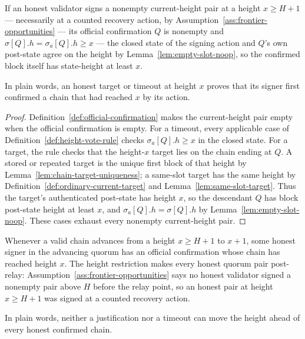 \begin{lemma}
\label{lem:height-vote-confirmation}
If an honest validator signs a nonempty current-height pair at a height
\(x\geq H+1\) --- necessarily at a counted recovery action, by
Assumption~\ref{ass:frontier-opportunities} ---
its official confirmation \(Q\) is nonempty and
\(\sigma[Q].h=\sigma_a[Q].h\geq x\) --- the closed state of the signing
action and \(Q\)'s own post-state agree on the height by
Lemma~\ref{lem:empty-slot-noop}, so the confirmed block itself has
state-height at least \(x\).

In plain words, an honest target or timeout at height \(x\) proves that its
signer first confirmed a chain that had reached \(x\) by its action.
\end{lemma}

\begin{proof}
Definition~\ref{def:official-confirmation} makes the current-height pair empty
when the official confirmation is empty.  For a timeout, every applicable
case of Definition~\ref{def:height-vote-rule} checks
\(\sigma_a[Q].h\geq x\) in the closed state.  For a target, the rule checks that the height-\(x\)
target lies on the chain ending at \(Q\).  A stored or repeated target is the
unique first block of that height by
Lemma~\ref{lem:chain-target-uniqueness}; a same-slot target has the same
height by Definition~\ref{def:ordinary-current-target} and
Lemma~\ref{lem:same-slot-target}.  Thus the target's authenticated post-state
has height \(x\), so the descendant \(Q\) has block post-state height at
least \(x\), and \(\sigma_a[Q].h=\sigma[Q].h\) by
Lemma~\ref{lem:empty-slot-noop}.
These cases exhaust every nonempty current-height pair.
\end{proof}

\begin{lemma}
\label{lem:height-increase-confirmation}
Whenever a valid chain advances from a height \(x\geq H+1\) to
\(x+1\), some honest signer in the advancing quorum has an official
confirmation whose chain has reached height \(x\).  The height
restriction makes every honest quorum pair post-relay:
Assumption~\ref{ass:frontier-opportunities} says no honest validator
signed a nonempty pair above \(H\) before the relay point, so an honest
pair at height \(x\geq H+1\) was signed at a counted recovery action.

In plain words, neither a justification nor a timeout can move the height
ahead of every honest confirmed chain.
\end{lemma}

